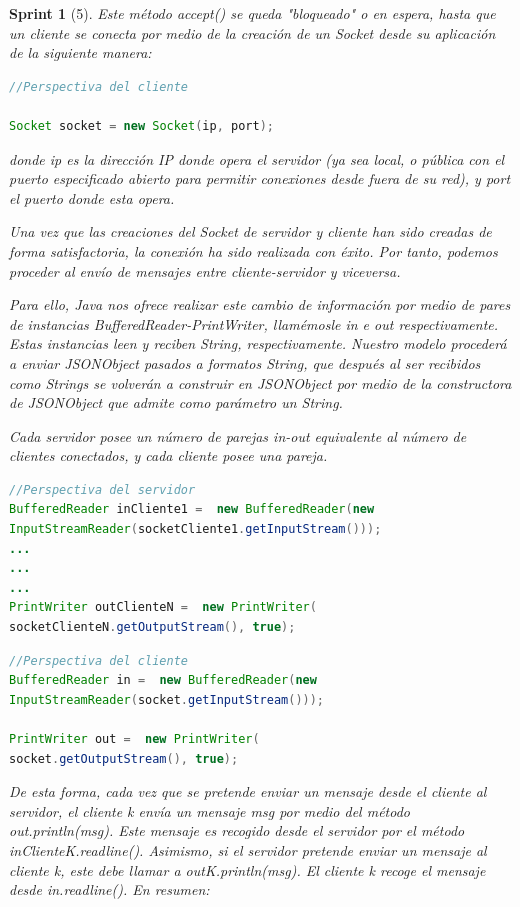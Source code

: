 \documentclass[12pt,a4paper,openright]{book}
\theoremstyle{break}
\newtheorem*{sprint}{Sprint}
\begin{document}
\begin{sprint}[5]
Este método accept() se queda "bloqueado" o en espera, hasta que un cliente se conecta por medio de la creación de un Socket desde su aplicación de la siguiente manera:

\begin{lstlisting}[frame=single, language=Java]
//Perspectiva del cliente

Socket socket = new Socket(ip, port);

\end{lstlisting}

donde ip es la dirección IP donde opera el servidor (ya sea local, o pública con el puerto especificado abierto para permitir conexiones desde fuera de su red), y port el puerto donde esta opera.

Una vez que las creaciones del Socket de servidor y cliente han sido creadas de forma satisfactoria, la conexión ha sido realizada con éxito. Por tanto, podemos proceder al envío de mensajes entre cliente-servidor y viceversa.

Para ello, Java nos ofrece realizar este cambio de información por medio de pares de instancias BufferedReader-PrintWriter, llamémosle in e out respectivamente. Estas instancias leen y reciben String, respectivamente. Nuestro modelo procederá a enviar JSONObject pasados a formatos String, que después al ser recibidos como Strings se volverán a construir en JSONObject por medio de la constructora de JSONObject que admite como parámetro un String.

Cada servidor posee un número de parejas in-out equivalente al número de clientes conectados, y cada cliente posee una pareja.

\begin{lstlisting}[frame=single, language=Java]
//Perspectiva del servidor
BufferedReader inCliente1 =  new BufferedReader(new
InputStreamReader(socketCliente1.getInputStream()));
...
...
...
PrintWriter outClienteN =  new PrintWriter(
socketClienteN.getOutputStream(), true);
\end{lstlisting}

\begin{lstlisting}[frame=single, language=Java]
//Perspectiva del cliente
BufferedReader in =  new BufferedReader(new
InputStreamReader(socket.getInputStream()));

PrintWriter out =  new PrintWriter(
socket.getOutputStream(), true);
\end{lstlisting}


De esta forma, cada vez que se pretende enviar un mensaje desde el cliente al servidor, el cliente k envía un mensaje msg por medio del método out.println(msg). Este mensaje es recogido desde el servidor por el método inClienteK.readline(). Asimismo, si el servidor pretende enviar un mensaje al cliente k, este debe llamar a outK.println(msg). El cliente k recoge el mensaje desde in.readline(). En resumen:


\end{sprint}
\end{document}
